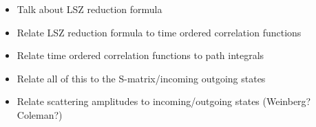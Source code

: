 \documentclass{book}
\begin{document}
\begin{itemize}
\item Talk about LSZ reduction formula
\item Relate LSZ reduction formula to time ordered correlation functions
\item Relate time ordered correlation functions to path integrals
\item Relate all of this to the S-matrix/incoming outgoing states
\item Relate scattering amplitudes to incoming/outgoing states (Weinberg? Coleman?)
\end{itemize}
\end{document}
